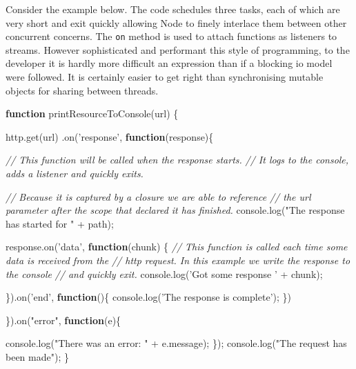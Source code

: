 \documentclass[]{article}
\newenvironment{Shaded}{}{}
\newcommand{\KeywordTok}[1]{\textcolor[rgb]{0.00,0.44,0.13}{\textbf{{#1}}}}
\newcommand{\StringTok}[1]{\textcolor[rgb]{0.25,0.44,0.63}{{#1}}}
\newcommand{\CommentTok}[1]{\textcolor[rgb]{0.38,0.63,0.69}{\textit{{#1}}}}
\newcommand{\OtherTok}[1]{\textcolor[rgb]{0.00,0.44,0.13}{{#1}}}
\newcommand{\FunctionTok}[1]{\textcolor[rgb]{0.02,0.16,0.49}{{#1}}}
\newcommand{\NormalTok}[1]{{#1}}
\begin{document}
Consider the example below. The code schedules three tasks, each of
which are very short and exit quickly allowing Node to finely interlace
them between other concurrent concerns. The \texttt{on} method is used
to attach functions as listeners to streams. However sophisticated and
performant this style of programming, to the developer it is hardly more
difficult an expression than if a blocking io model were followed. It is
certainly easier to get right than synchronising mutable objects for
sharing between threads.

\begin{Shaded}
\begin{Highlighting}[]
\KeywordTok{function} \FunctionTok{printResourceToConsole}\NormalTok{(url) \{}

   \OtherTok{http}\NormalTok{.}\FunctionTok{get}\NormalTok{(url)}
      \NormalTok{.}\FunctionTok{on}\NormalTok{(}\StringTok{'response'}\NormalTok{, }\KeywordTok{function}\NormalTok{(response)\{}
      
         \CommentTok{// This function will be called when the response starts.}
         \CommentTok{// It logs to the console, adds a listener and quickly exits.}
         
         \CommentTok{// Because it is captured by a closure we are able to reference }
         \CommentTok{// the url parameter after the scope that declared it has finished.            }
         \OtherTok{console}\NormalTok{.}\FunctionTok{log}\NormalTok{(}\StringTok{"The response has started for "} \NormalTok{+ path);}
      
         \OtherTok{response}\NormalTok{.}\FunctionTok{on}\NormalTok{(}\StringTok{'data'}\NormalTok{, }\KeywordTok{function}\NormalTok{(chunk) \{      }
            \CommentTok{// This function is called each time some data is received from the }
            \CommentTok{// http request. In this example we write the response to the console}
            \CommentTok{// and quickly exit.}
            \OtherTok{console}\NormalTok{.}\FunctionTok{log}\NormalTok{(}\StringTok{'Got some response '} \NormalTok{+ chunk);}
                   
         \NormalTok{\}).}\FunctionTok{on}\NormalTok{(}\StringTok{'end'}\NormalTok{, }\KeywordTok{function}\NormalTok{()\{}
            \OtherTok{console}\NormalTok{.}\FunctionTok{log}\NormalTok{(}\StringTok{'The response is complete'}\NormalTok{);}
         \NormalTok{\})}
         
      \NormalTok{\}).}\FunctionTok{on}\NormalTok{(}\StringTok{"error"}\NormalTok{, }\KeywordTok{function}\NormalTok{(e)\{}
         
         \OtherTok{console}\NormalTok{.}\FunctionTok{log}\NormalTok{(}\StringTok{"There was an error: "} \NormalTok{+ }\OtherTok{e}\NormalTok{.}\FunctionTok{message}\NormalTok{);}
      \NormalTok{\});      }
   \OtherTok{console}\NormalTok{.}\FunctionTok{log}\NormalTok{(}\StringTok{"The request has been made"}\NormalTok{);}
\NormalTok{\}   }
\end{Highlighting}
\end{Shaded}
\end{document}
